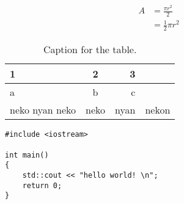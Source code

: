 \begin{equation}
\begin{split}
A & = \frac{\pi r^2}{2}\\
 & = \frac{1}{2} \pi r^2
 \end{split}
\end{equation}

\begin{table}[t!]%
  \centering
  \caption{Caption for the table.}
  \label{tab:table1}
  \begin{tabular}{l|c||r||c}
    1 & 2 & 3\\
    \hline
    a & b & c\\
    \hline
    neko nyan neko& neko & nyan & nekon\\
  \end{tabular}
\end{table}

\begin{verbatim}
#include <iostream>
 
int main()
{
    std::cout << "hello world! \n";
    return 0;
}
\end{verbatim}

